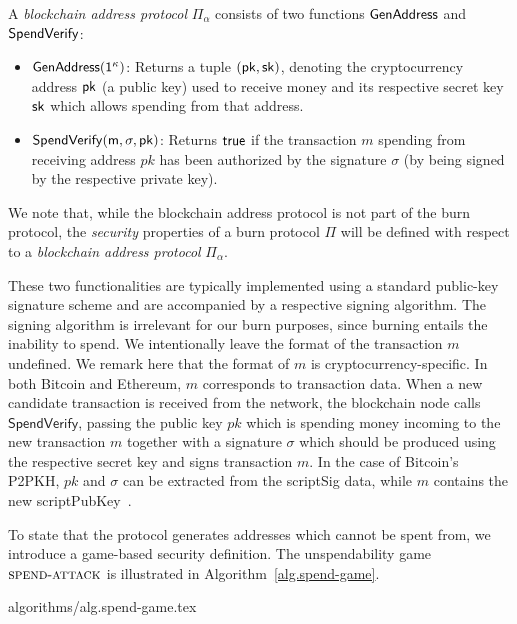 \begin{definition}
  A \emph{blockchain address protocol} $\Pi_\alpha$ consists of two functions $\sf{GenAddress}$ and $\sf{SpendVerify}$:

  \begin{itemize}
    \item $\sf{GenAddress}(1^\kappa)$: Returns a tuple $(\sf{pk}, \sf{sk})$, denoting the cryptocurrency address $\sf{pk}$ (a public key) used to receive money and its respective secret key $\sf{sk}$ which allows spending from that address.

    \item $\sf{SpendVerify}(m, \sigma, pk)$: Returns $\sf{true}$ if the transaction $m$ spending from receiving address $pk$ has been authorized by the signature $\sigma$ (by being signed by the respective private key).
  \end{itemize}
\end{definition}

We note that, while the blockchain address protocol is not part of the burn protocol, the \emph{security} properties of a burn protocol $\Pi$ will be defined with respect to a \emph{blockchain address protocol} $\Pi_\alpha$.

These two functionalities are typically implemented using a standard public-key signature scheme and are accompanied by a respective signing algorithm. The signing algorithm is irrelevant for our burn purposes, since burning entails the inability to spend. We intentionally leave the format of the transaction $m$ undefined. We remark here that the format of $m$ is cryptocurrency-specific. In both Bitcoin and Ethereum, $m$ corresponds to transaction data. When a new candidate transaction is received from the network, the blockchain node calls $\textsf{SpendVerify}$, passing the public key $pk$ which is spending money incoming to the new transaction $m$ together with a signature $\sigma$ which should be produced using the respective secret key and signs transaction $m$. In the case of Bitcoin's P2PKH, $pk$ and $\sigma$ can be extracted from the scriptSig data, while $m$ contains the new scriptPubKey~\cite{bitcoin-dev-guide}.

To state that the protocol generates addresses which cannot be spent from, we introduce a game-based security definition. The unspendability game $\textsc{spend}\-\text{-}\-\textsc{attack}$ is illustrated in Algorithm~\ref{alg.spend-game}.

{algorithms/alg.spend-game.tex}

